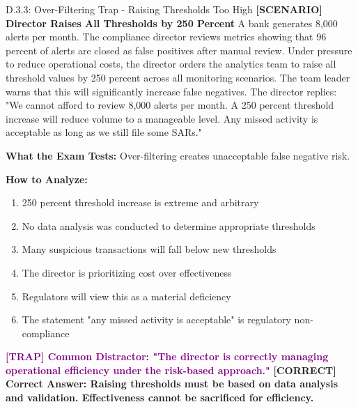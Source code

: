 \documentclass[11pt,a4paper]{beamer}
\newcommand{\trap}[1]{\textcolor{purple}{\textbf{[TRAP] #1}}}
\newcommand{\correct}[1]{\textcolor{green!50!black}{\textbf{[CORRECT] #1}}}
\newcommand{\scenario}[1]{\textcolor{blue!70!black}{\textbf{[SCENARIO] #1}}}
\begin{document}
\begin{frame}{D.3.3: Over-Filtering Trap - Raising Thresholds Too High}
	\scenario{Director Raises All Thresholds by 250 Percent}
	A bank generates 8,000 alerts per month. The compliance director reviews metrics showing that 96 percent of alerts are closed as false positives after manual review. Under pressure to reduce operational costs, the director orders the analytics team to raise all threshold values by 250 percent across all monitoring scenarios. The team leader warns that this will significantly increase false negatives. The director replies: "We cannot afford to review 8,000 alerts per month. A 250 percent threshold increase will reduce volume to a manageable level. Any missed activity is acceptable as long as we still file some SARs."
	
	\vspace{0.1cm}
	\textbf{What the Exam Tests:} Over-filtering creates unacceptable false negative risk.
	
	\vspace{0.1cm}
	\textbf{How to Analyze:}
	\begin{enumerate}
		\item 250 percent threshold increase is extreme and arbitrary
		\item No data analysis was conducted to determine appropriate thresholds
		\item Many suspicious transactions will fall below new thresholds
		\item The director is prioritizing cost over effectiveness
		\item Regulators will view this as a material deficiency
		\item The statement "any missed activity is acceptable" is regulatory non-compliance
	\end{enumerate}
	
	\trap{Common Distractor: "The director is correctly managing operational efficiency under the risk-based approach."}
	\correct{Correct Answer: Raising thresholds must be based on data analysis and validation. Effectiveness cannot be sacrificed for efficiency.}
\end{frame}
\end{document}
